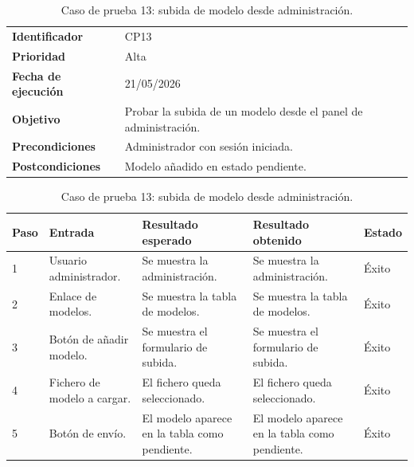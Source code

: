 \begin{table}[]
	\centering
	\footnotesize
	\renewcommand{\arraystretch}{1.2}
	\begin{tabularx}{\textwidth}{p{3.2cm} X}
		\toprule
		\textbf{Identificador} & CP13 \\
		\textbf{Prioridad} & Alta \\
		\textbf{Fecha de ejecución} & 21/05/2026 \\
		\textbf{Objetivo} & Probar la subida de un modelo desde el panel de administración. \\
		\textbf{Precondiciones} & Administrador con sesión iniciada. \\
		\textbf{Postcondiciones} & Modelo añadido en estado pendiente. \\
		\midrule
	\end{tabularx}
	\begin{tabularx}{\textwidth}{p{0.8cm} p{3.2cm} X X p{1.3cm}}
		\textbf{Paso} & \textbf{Entrada} & \textbf{Resultado esperado} & \textbf{Resultado obtenido} & \textbf{Estado} \\
		\midrule
		1 & Usuario administrador. & Se muestra la administración. & Se muestra la administración. & Éxito \\
		2 & Enlace de modelos. & Se muestra la tabla de modelos. & Se muestra la tabla de modelos. & Éxito \\
		3 & Botón de añadir modelo. & Se muestra el formulario de subida. & Se muestra el formulario de subida. & Éxito \\
		4 & Fichero de modelo a cargar. & El fichero queda seleccionado. & El fichero queda seleccionado. & Éxito \\
		5 & Botón de envío. & El modelo aparece en la tabla como pendiente. & El modelo aparece en la tabla como pendiente. & Éxito \\
		\bottomrule
	\end{tabularx}
	\caption{Caso de prueba 13: subida de modelo desde administración.}
	\label{tab:cp13}
\end{table}

